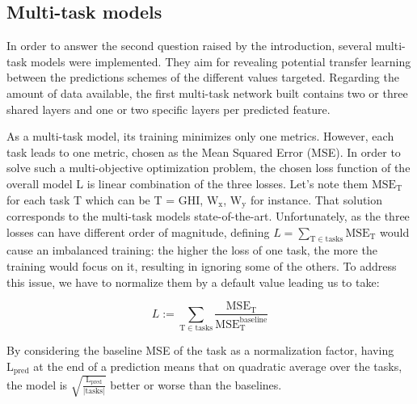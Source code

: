 \documentclass{article}
\newcommand{\saut}{\vspace{10px}}
\begin{document}
\subsection*{Multi-task models}

In order to answer the second question raised by the introduction, several multi-task models were implemented.
They aim for revealing potential transfer learning between the predictions schemes of the different values targeted.
Regarding the amount of data available, the first multi-task network built contains two or three shared layers and
one or two specific layers per predicted feature.

\saut

As a multi-task model, its training minimizes only one metrics. However, each task leads to one metric, chosen as
the Mean Squared Error (MSE). In order to solve such a multi-objective optimization problem, the chosen loss
function of the overall model L is linear combination of the three losses. Let's note them
$\mathrm{MSE}_{\mathrm T}$
for each task T which can be T = GHI, $\mathrm W_{\mathrm x}$, $\mathrm W_{\mathrm y}$ for instance.
That solution corresponds to the multi-task models state-of-the-art.
Unfortunately, as the three losses can have different order of magnitude, defining
$L = \sum_{\mathrm T \in \mathrm{tasks}} \mathrm{MSE}_{\mathrm T}$ would cause an imbalanced training: the
higher the loss of one task, the more the training would focus on it, resulting in ignoring some of the others. To address
this issue, we have to normalize them by a default value leading us to take:

\[
	L := \sum_{\mathrm T \in \mathrm{tasks}}
	\frac{\mathrm{MSE}_{\mathrm T}}{\mathrm{MSE}^{\mathrm{baseline}}_{\mathrm T}}
\]

By considering the baseline MSE of the task as a normalization factor, having $\mathrm L_{\mathrm{pred}}$ at
the end of a prediction means that on quadratic average over the tasks, the model is
$\sqrt{\frac{\mathrm L_{\mathrm{pred}}}{| \mathrm{tasks} | }}$ better or worse than the baselines.

\vspace{-40px}
\end{document}
